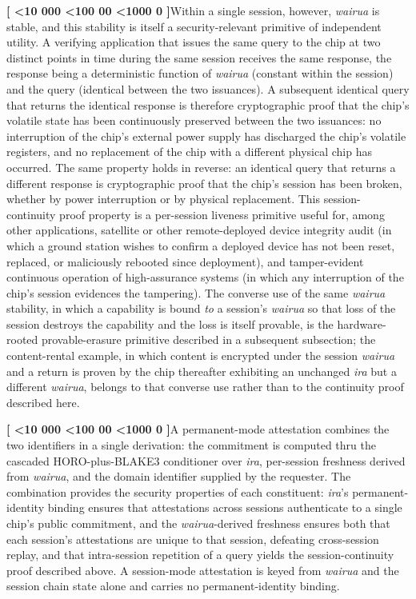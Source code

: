 \documentclass[12pt,letterpaper]{article}
\newcounter{para}
\newcommand{\padzero}{%
  \ifnum\value{para}<10 000\else%
  \ifnum\value{para}<100 00\else%
  \ifnum\value{para}<1000 0\else%
  \fi\fi\fi}
\newcommand{\para}{%
  \refstepcounter{para}\noindent\textbf{[\padzero\arabic{para}]}\hspace{0.5em}\ignorespaces}
\begin{document}
\para Within a single session, however, \emph{wairua} is stable, and this stability is itself a security-relevant primitive of independent utility. A verifying application that issues the same query to the chip at two distinct points in time during the same session receives the same response, the response being a deterministic function of \emph{wairua} (constant within the session) and the query (identical between the two issuances). A subsequent identical query that returns the identical response is therefore cryptographic proof that the chip's volatile state has been continuously preserved between the two issuances: no interruption of the chip's external power supply has discharged the chip's volatile registers, and no replacement of the chip with a different physical chip has occurred. The same property holds in reverse: an identical query that returns a different response is cryptographic proof that the chip's session has been broken, whether by power interruption or by physical replacement. This session-continuity proof property is a per-session liveness primitive useful for, among other applications, satellite or other remote-deployed device integrity audit (in which a ground station wishes to confirm a deployed device has not been reset, replaced, or maliciously rebooted since deployment), and tamper-evident continuous operation of high-assurance systems (in which any interruption of the chip's session evidences the tampering). The converse use of the same \emph{wairua} stability, in which a capability is bound \emph{to} a session's \emph{wairua} so that loss of the session destroys the capability and the loss is itself provable, is the hardware-rooted provable-erasure primitive described in a subsequent subsection; the content-rental example, in which content is encrypted under the session \emph{wairua} and a return is proven by the chip thereafter exhibiting an unchanged \emph{ira} but a different \emph{wairua}, belongs to that converse use rather than to the continuity proof described here.

\para A permanent-mode attestation combines the two identifiers in a single derivation: the commitment is computed thru the cascaded HORO-plus-BLAKE3 conditioner over \emph{ira}, per-session freshness derived from \emph{wairua}, and the domain identifier supplied by the requester. The combination provides the security properties of each constituent: \emph{ira}'s permanent-identity binding ensures that attestations across sessions authenticate to a single chip's public commitment, and the \emph{wairua}-derived freshness ensures both that each session's attestations are unique to that session, defeating cross-session replay, and that intra-session repetition of a query yields the session-continuity proof described above. A session-mode attestation is keyed from \emph{wairua} and the session chain state alone and carries no permanent-identity binding.
\end{document}
